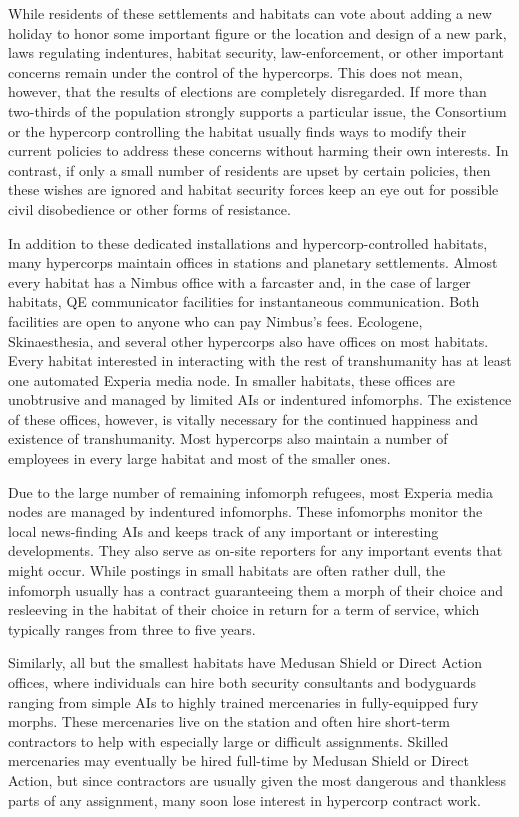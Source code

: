 While residents of these settlements and habitats 
can vote about adding a new holiday to honor some 
important figure or the location and design of a 
new park, laws regulating indentures, habitat security, law-enforcement, or other important concerns 
remain under the control of the hypercorps. This 
does not mean, however, that the results of elections 
are completely disregarded. If more than two-thirds 
of the population strongly supports a particular 
issue, the Consortium or the hypercorp controlling 
the habitat usually finds ways to modify their current 
policies to address these concerns without harming their own interests. In contrast, if only a small 
number of residents are upset by certain policies, 
then these wishes are ignored and habitat security 
forces keep an eye out for possible civil disobedience 
or other forms of resistance.

In addition to these dedicated installations and 
hypercorp-controlled habitats, many hypercorps 
maintain offices in stations and planetary settlements. Almost every habitat has a Nimbus office 
with a farcaster and, in the case of larger habitats, 
QE communicator facilities for instantaneous communication. Both facilities are open to anyone who 
can pay Nimbus's fees. Ecologene, Skinaesthesia, 
and several other hypercorps also have offices on 
most habitats. Every habitat interested in interacting with the rest of transhumanity has at least one 
automated Experia media node. In smaller habitats, 
these offices are unobtrusive and managed by limited AIs or indentured infomorphs. The existence 
of these offices, however, is vitally necessary for the 
continued happiness and existence of transhumanity. Most hypercorps also maintain a number of 
employees in every large habitat and most of the 
smaller ones.

Due to the large number of remaining infomorph 
refugees, most Experia media nodes are managed by 
indentured infomorphs. These infomorphs monitor 
the local news-finding AIs and keeps track of any 
important or interesting developments. They also 
serve as on-site reporters for any important events 
that might occur. While postings in small habitats 
are often rather dull, the infomorph usually has a 
contract guaranteeing them a morph of their choice 
and resleeving in the habitat of their choice in return 
for a term of service, which typically ranges from 
three to five years.

Similarly, all but the smallest habitats have Medusan Shield or Direct Action offices, where individuals 
can hire both security consultants and bodyguards 
ranging from simple AIs to highly trained mercenaries in fully-equipped fury morphs. These mercenaries 
live on the station and often hire short-term contractors to help with especially large or difficult assignments. Skilled mercenaries may eventually be hired 
full-time by Medusan Shield or Direct Action, but 
since contractors are usually given the most dangerous and thankless parts of any assignment, many 
soon lose interest in hypercorp contract work.

